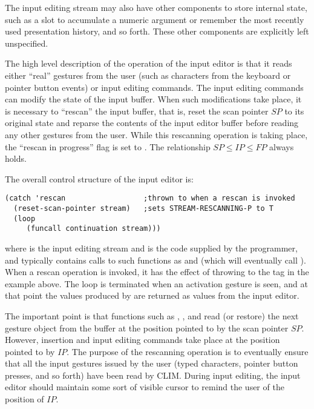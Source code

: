 The input editing stream may also have other components to store internal state,
such as a slot to accumulate a numeric argument or remember the most recently
used presentation history, and so forth.  These other components are explicitly
left unspecified.

The high level description of the operation of the input editor is that it reads
either ``real'' gestures from the user (such as characters from the keyboard or
pointer button events) or input editing commands.  The input editing commands
can modify the state of the input buffer.  When such modifications take place,
it is necessary to ``rescan'' the input buffer, that is, reset the scan pointer
$SP$ to its original state and reparse the contents of the input editor buffer
before reading any other gestures from the user.  While this rescanning
operation is taking place, the ``rescan in progress'' flag is set to
.  The relationship $SP \leq IP \leq FP$ always holds.

The overall control structure of the input editor is:

\begin{verbatim}
(catch 'rescan                  ;thrown to when a rescan is invoked
  (reset-scan-pointer stream)   ;sets STREAM-RESCANNING-P to T
  (loop
     (funcall continuation stream)))
\end{verbatim}

where  is the input editing stream and  is the
code supplied by the programmer, and typically contains calls to such functions
as  and  (which will eventually call
).  When a rescan operation is invoked, it has the
effect of throwing to the  tag in the example above.  The loop is
terminated when an activation gesture is seen, and at that point the values
produced by  are returned as values from the input editor.

The important point is that functions such as , ,
and  read (or restore) the next gesture object from the
buffer at the position pointed to by the scan pointer $SP$.  However, insertion
and input editing commands take place at the position pointed to by $IP$.  The
purpose of the rescanning operation is to eventually ensure that all the input
gestures issued by the user (typed characters, pointer button presses, and so
forth) have been read by CLIM.  During input editing, the input editor should
maintain some sort of visible cursor to remind the user of the position of $IP$.

